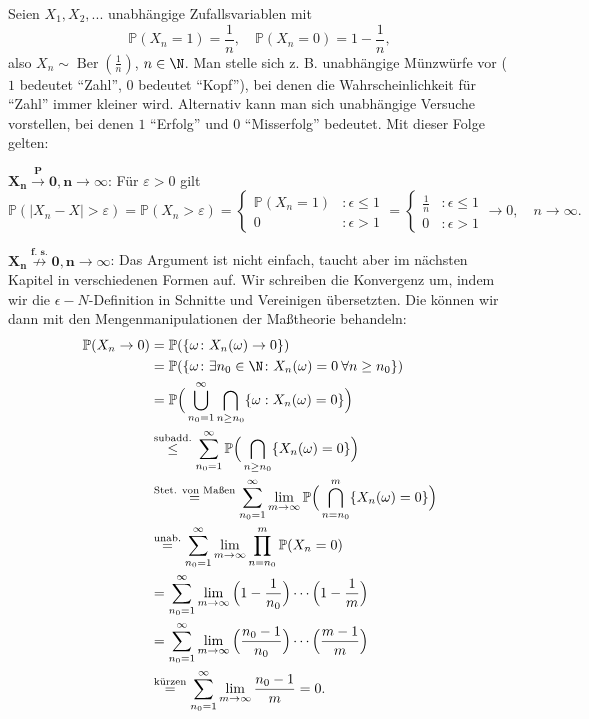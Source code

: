 \begin{beispiel}\label{Adam}
	Seien $X_1, X_2, ... $ unabh\"angige Zufallsvariablen mit $$\mathbb{P}(X_n = 1) = \frac{1}{n}, \quad \mathbb{P}(X_n = 0) = 1 - \frac{1}{n},$$ also $X_n \sim \operatorname{Ber}(\frac{1}{n})$, $n \in \N$. Man stelle sich z. B. unabh\"angige M\"unzw\"urfe vor ($1$ bedeutet \enquote{Zahl}, $0$ bedeutet \enquote{Kopf}), bei denen die Wahrscheinlichkeit f\"ur \enquote{Zahl} immer kleiner wird. Alternativ kann man sich unabh\"angige Versuche vorstellen, bei denen $1$ \enquote{Erfolg} und $0$ \enquote{Misserfolg} bedeutet. Mit dieser Folge gelten:\smallskip
	
	$\mathbf{X_n \overset{P}{\longrightarrow}0, n \to \infty}$:
	Für $\varepsilon > 0$ gilt 
	\[ \mathbb{P}(|X_n - X| > \varepsilon) = \mathbb{P}(X_n > \varepsilon) = 
	\begin{cases} 
	\mathbb{P}(X_n = 1)&: \epsilon\leq 1\\
	0&: \epsilon> 1
	\end{cases}
	 = 
	 \begin{cases}
		 \frac{1}{n}&: \epsilon\leq 1\\
		 0 &: \epsilon >1
	\end{cases}	 
		 \to 0, \quad n \to \infty.
		  \]
	
	$\mathbf{X_n \overset{\text{f. s.}}{\not\longrightarrow}0, n \to \infty}$: Das Argument ist nicht einfach, taucht aber im n\"achsten Kapitel in verschiedenen Formen auf. Wir schreiben die Konvergenz um, indem wir die $\epsilon-N$-Definition in Schnitte und Vereinigen \"ubersetzten. Die k\"onnen wir dann mit den Mengenmanipulationen der Ma\ss theorie behandeln:
	\begin{align*}
		\mathbb{P}(X_n \to 0) &= \mathbb{P}(\{ \omega\colon X_n(\omega) \to 0 \})\\
		& = \mathbb{P}(\{ \omega\colon \exists n_0 \in \N \colon X_n(\omega) = 0 \: \forall n \geq n_0 \})\\
		&= \mathbb{P}\Big(\bigcup_{n_0 = 1}^{\infty} \bigcap_{n \geq n_0} \{ \omega: X_n(\omega) = 0 \}\Big)\\
		& \overset{\text{subadd.}}{\leq} \sum\limits_{n_0 = 1}^{\infty} \mathbb{P}\Big(\bigcap_{n \geq n_0} \{ X_n(\omega) = 0 \}\Big)\\
		& \overset{\text{Stet. von Ma\ss en}}{=} \sum\limits_{n_0 = 1}^{\infty} \lim_{m\to\infty}  \mathbb{P}\Big(\bigcap_{n = n_0}^m \{ X_n(\omega) = 0 \}\Big)\\
		& \overset{\text{unab.}}{=} \sum\limits_{n_0 = 1}^{\infty} \lim_{m\to\infty} \prod_{n=n_0}^m \mathbb{P}(X_n = 0)\\
		& = \sum\limits_{n_0 = 1}^{\infty} \lim_{m\to\infty}  \Big(1-\frac{1}{n_0}\Big)\cdots \Big(1-\frac{1}{m}\Big)\\
		& = \sum\limits_{n_0 = 1}^{\infty} \lim_{m\to\infty}  \Big(\frac{n_0-1}{n_0}\Big)\cdots \Big(\frac{m-1}{m}\Big)\\
		& \overset{\text{k\"urzen}}{=} \sum\limits_{n_0 = 1}^{\infty} \lim_{m\to\infty}  \frac{n_0-1}{m}=0.
	\end{align*}
\end{beispiel}
